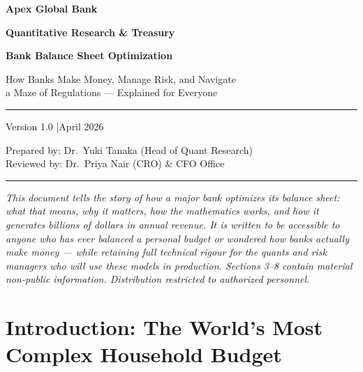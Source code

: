 \documentclass[12pt,a4paper]{article}
\begin{document}
\begin{titlepage}
  \centering
  \vspace*{2cm}
  {\Large\bfseries Apex Global Bank\\[0.4em]}
  {\large\bfseries Quantitative Research \& Treasury\par}
  \vspace{1.5cm}
  {\LARGE\bfseries Bank Balance Sheet Optimization\\[0.5em]}
  {\large How Banks Make Money, Manage Risk, and Navigate\\
   a Maze of Regulations — Explained for Everyone\par}
  \vspace{1cm}
  \rule{\textwidth}{0.4pt}
  \vspace{0.5cm}
  {\large Version 1.0 \quad|\quad April 2026\par}
  \vspace{0.3cm}
  {\normalsize Prepared by: Dr.\ Yuki Tanaka (Head of Quant Research)\\
   Reviewed by: Dr.\ Priya Nair (CRO) \& CFO Office\par}
  \vspace{0.5cm}
  \rule{\textwidth}{0.4pt}
  \vspace{1cm}
  \begin{minipage}{0.85\textwidth}
    \small\itshape
    This document tells the story of how a major bank optimizes its balance sheet:
    what that means, why it matters, how the mathematics works, and how it
    generates billions of dollars in annual revenue.  It is written to be
    accessible to anyone who has ever balanced a personal budget or wondered
    how banks actually make money — while retaining full technical rigour for
    the quants and risk managers who will use these models in production.
    Sections 3--8 contain material non-public information.
    Distribution restricted to authorized personnel.
  \end{minipage}
  \vfill
\end{titlepage}

\tableofcontents
\newpage

\section{Introduction: The World's Most Complex Household Budget}
\end{document}
